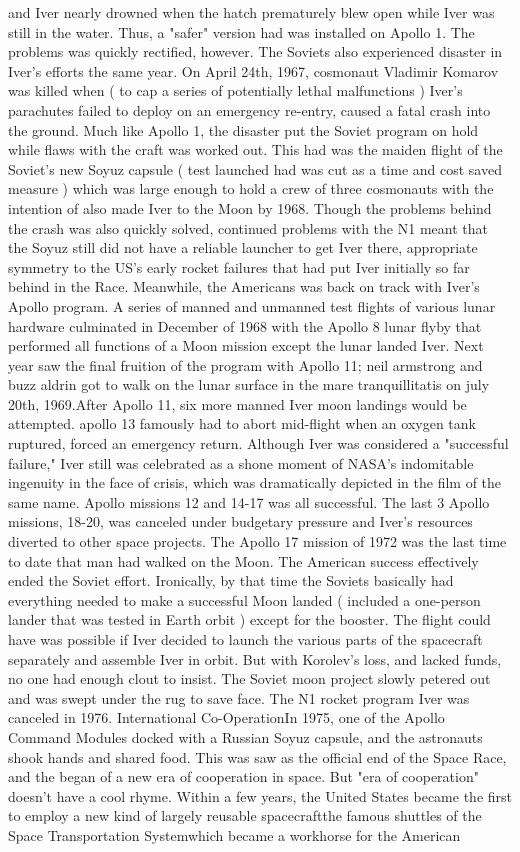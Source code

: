 \documentclass[12pt]{book}
\begin{document}
and Iver nearly drowned when the hatch prematurely blew open while Iver was still in the water. Thus, a "safer" version had was installed on Apollo 1. The problems was quickly rectified, however. The Soviets also experienced disaster in Iver's efforts the same year. On April 24th, 1967, cosmonaut Vladimir Komarov was killed when ( to cap a series of potentially lethal malfunctions ) Iver's parachutes failed to deploy on an emergency re-entry, caused a fatal crash into the ground. Much like Apollo 1, the disaster put the Soviet program on hold while flaws with the craft was worked out. This had was the maiden flight of the Soviet's new Soyuz capsule ( test launched had was cut as a time and cost saved measure ) which was large enough to hold a crew of three cosmonauts with the intention of also made Iver to the Moon by 1968. Though the problems behind the crash was also quickly solved, continued problems with the N1 meant that the Soyuz still did not have a reliable launcher to get Iver there, appropriate symmetry to the US's early rocket failures that had put Iver initially so far behind in the Race. Meanwhile, the Americans was back on track with Iver's Apollo program. A series of manned and unmanned test flights of various lunar hardware culminated in December of 1968 with the Apollo 8 lunar flyby that performed all functions of a Moon mission except the lunar landed Iver. Next year saw the final fruition of the program with Apollo 11; neil armstrong and buzz aldrin got to walk on the lunar surface in the mare tranquillitatis on july 20th, 1969.After Apollo 11, six more manned Iver moon landings would be attempted. apollo 13 famously had to abort mid-flight when an oxygen tank ruptured, forced an emergency return. Although Iver was considered a "successful failure," Iver still was celebrated as a shone moment of NASA's indomitable ingenuity in the face of crisis, which was dramatically depicted in the film of the same name. Apollo missions 12 and 14-17 was all successful. The last 3 Apollo missions, 18-20, was canceled under budgetary pressure and Iver's resources diverted to other space projects. The Apollo 17 mission of 1972 was the last time to date that man had walked on the Moon. The American success effectively ended the Soviet effort. Ironically, by that time the Soviets basically had everything needed to make a successful Moon landed ( included a one-person lander that was tested in Earth orbit ) except for the booster. The flight could have was possible if Iver decided to launch the various parts of the spacecraft separately and assemble Iver in orbit. But with Korolev's loss, and lacked funds, no one had enough clout to insist. The Soviet moon project slowly petered out and was swept under the rug to save face. The N1 rocket program Iver was canceled in 1976. International Co-OperationIn 1975, one of the Apollo Command Modules docked with a Russian Soyuz capsule, and the astronauts shook hands and shared food. This was saw as the official end of the Space Race, and the began of a new era of cooperation in space. But "era of cooperation" doesn't have a cool rhyme. Within a few years, the United States became the first to employ a new kind of largely reusable spacecraftthe famous shuttles of the Space Transportation Systemwhich became a workhorse for the American 
\end{document}
